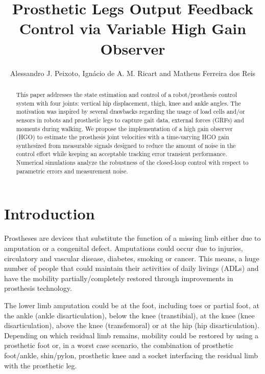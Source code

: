 \documentclass[letterpaper, 10 pt, conference]{ieeeconf}  %
\title{\LARGE \bf
Prosthetic Legs Output Feedback Control via Variable High Gain Observer}
\author{Alessandro J. Peixoto, %
        Ign\'{a}cio de A. M. Ricart and
        Matheus Ferreira dos Reis %
}
\theoremstyle{plain}
\theoremstyle{definition}
\theoremstyle{remark}
\begin{document}

\maketitle
\thispagestyle{empty}
\pagestyle{empty}
\begin{abstract}%
This paper addresses the state estimation and control of a robot/prosthesis control system with four joints: vertical hip displacement, thigh, knee and ankle angles. The motivation was inspired by several drawbacks regarding the usage of load cells and/or sensors in robots and prosthetic legs to capture gait data, external forces (GRFs) and moments during walking. We propose the implementation of a high gain observer (HGO)  to estimate the  prosthesis joint velocities with a time-varying HGO gain synthesized from measurable signals designed to reduce the amount of noise in the control effort while keeping an acceptable tracking error transient performance. Numerical simulations analyze the robustness of the closed-loop control with respect
to parametric errors and measurement noise.
\end{abstract}
\section{Introduction}

Prostheses are devices that substitute the function of a missing limb either due to amputation or a congenital defect. Amputations could occur due to injuries, circulatory and vascular disease, diabetes, smoking or cancer. This means, a huge number of people that could maintain their activities of daily livings (ADLs) and have the mobility partially/completely restored through improvements in prosthesis technology.

The lower limb amputation could be at the foot, including toes or partial foot, at the ankle (ankle disarticulation), below the knee (transtibial), at the knee (knee disarticulation), above the knee (transfemoral) or at the hip (hip disarticulation). Depending on which residual limb remains, mobility could be restored by using a prosthetic foot or, in a worst case scenario, the combination of prosthetic foot/ankle, shin/pylon, prosthetic knee and a socket interfacing the residual limb with the prosthetic leg. 
\end{document}
